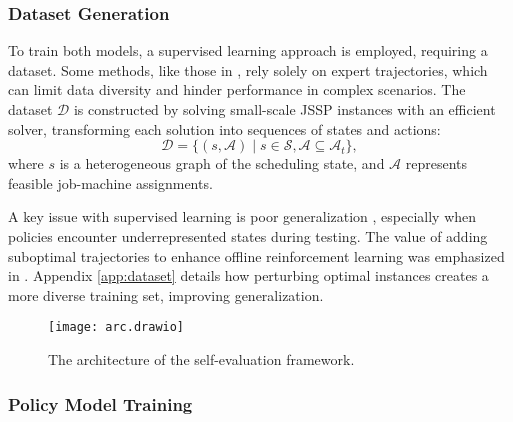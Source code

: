 \subsubsection{Dataset Generation}

To train both models, a supervised learning approach is employed, requiring a dataset. Some methods, like those in \cite{kool2019attention, drakulic2024bq}, rely solely on expert trajectories, which can limit data diversity and hinder performance in complex scenarios. The dataset $\mathcal{D}$ is constructed by solving small-scale JSSP instances with an efficient solver, transforming each solution into sequences of states and actions:
\[
\mathcal{D} = \{(s, \mathcal{A}) \mid s \in \mathcal{S}, \mathcal{A} \subseteq \mathcal{A}_t \},
\]
where $s$ is a heterogeneous graph of the scheduling state, and $\mathcal{A}$ represents feasible job-machine assignments. 

A key issue with supervised learning is poor generalization \cite{ross2010efficient}, especially when policies encounter underrepresented states during testing. The value of adding suboptimal trajectories to enhance offline reinforcement learning was emphasized in \cite{kumar2021should, andres2025using}. Appendix \ref{app:dataset} details how perturbing optimal instances creates a more diverse training set, improving generalization.

 \begin{figure*}[h] \centering \texttt{[image: arc.drawio]} \caption{The architecture of the self-evaluation framework.} \label{fig:arcapp} \end{figure*}
 
\subsubsection{Policy Model Training}

